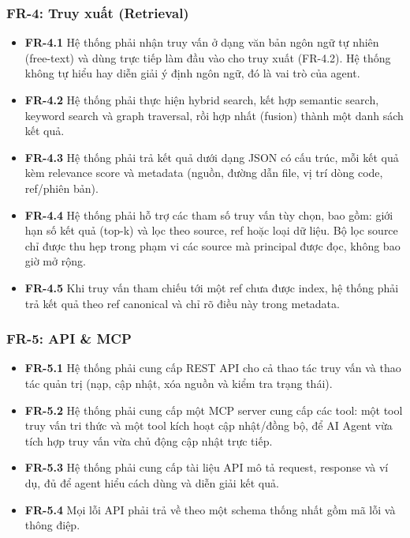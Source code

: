 \subsubsection*{FR-4: Truy xuất (Retrieval)}

\begin{itemize}
  \item \textbf{FR-4.1} Hệ thống phải nhận truy vấn ở dạng văn bản ngôn ngữ tự nhiên (free-text) và dùng trực tiếp làm đầu vào cho truy xuất (FR-4.2). Hệ thống không tự hiểu hay diễn giải ý định ngôn ngữ, đó là vai trò của agent.
  \item \textbf{FR-4.2} Hệ thống phải thực hiện hybrid search, kết hợp semantic search, keyword search và graph traversal, rồi hợp nhất (fusion) thành một danh sách kết quả.
  \item \textbf{FR-4.3} Hệ thống phải trả kết quả dưới dạng JSON có cấu trúc, mỗi kết quả kèm relevance score và metadata (nguồn, đường dẫn file, vị trí dòng code, ref/phiên bản).
  \item \textbf{FR-4.4} Hệ thống phải hỗ trợ các tham số truy vấn tùy chọn, bao gồm: giới hạn số kết quả (top-k) và lọc theo source, ref hoặc loại dữ liệu. Bộ lọc source chỉ được thu hẹp trong phạm vi các source mà principal được đọc, không bao giờ mở rộng.
  \item \textbf{FR-4.5} Khi truy vấn tham chiếu tới một ref chưa được index, hệ thống phải trả kết quả theo ref canonical và chỉ rõ điều này trong metadata.
\end{itemize}

\subsubsection*{FR-5: API \& MCP}

\begin{itemize}
  \item \textbf{FR-5.1} Hệ thống phải cung cấp REST API cho cả thao tác truy vấn và thao tác quản trị (nạp, cập nhật, xóa nguồn và kiểm tra trạng thái).
  \item \textbf{FR-5.2} Hệ thống phải cung cấp một MCP server cung cấp các tool: một tool truy vấn tri thức và một tool kích hoạt cập nhật/đồng bộ, để AI Agent vừa tích hợp truy vấn vừa chủ động cập nhật trực tiếp.
  \item \textbf{FR-5.3} Hệ thống phải cung cấp tài liệu API mô tả request, response và ví dụ, đủ để agent hiểu cách dùng và diễn giải kết quả.
  \item \textbf{FR-5.4} Mọi lỗi API phải trả về theo một schema thống nhất gồm mã lỗi và thông điệp.
\end{itemize}


